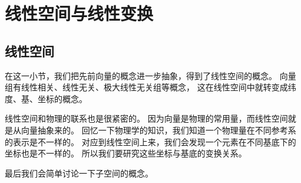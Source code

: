 \chapter{线性空间与线性变换}

\section{线性空间}
在这一小节，我们把先前向量的概念进一步抽象，得到了线性空间的概念。
向量组有线性相关、线性无关、极大线性无关组等概念，
这在线性空间中就转变成纬度、基、坐标的概念。

线性空间和物理的联系也是很紧密的。
因为向量是物理的常用量，而线性空间就是从向量抽象来的。
回忆一下物理学的知识，我们知道一个物理量在不同参考系的表示是不一样的。
对应到线性空间上来，我们会发现一个元素在不同基底下的坐标也是不一样的。
所以我们要研究这些坐标与基底的变换关系。

最后我们会简单讨论一下子空间的概念。

